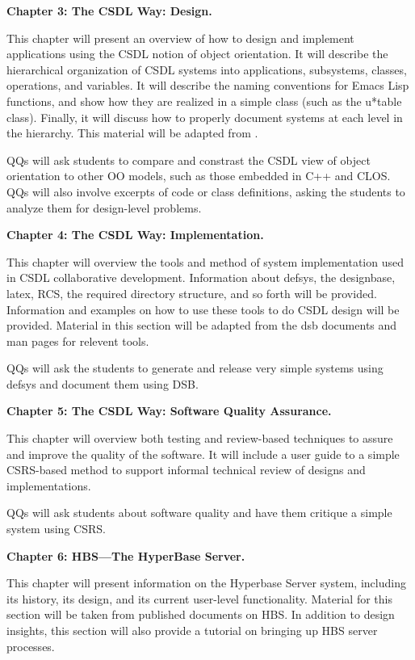 \begin{itemizenoindent}
\item {\bf Chapter 3: The CSDL Way: Design.} 

This chapter will present an overview of how to design and implement
applications using the CSDL notion of object orientation.  It will describe
the hierarchical organization of CSDL systems into applications,
subsystems, classes, operations, and variables.  It will describe the
naming conventions for Emacs Lisp functions, and show how they are realized
in a simple class (such as the u*table class).  Finally, it will discuss
how to properly document systems at each level in the hierarchy.  This
material will be adapted from \cite{csdl-93-02}.

QQs will ask students to compare and constrast the CSDL view of object
orientation to other OO models, such as those embedded in C++ and CLOS.
QQs will also involve excerpts of code or class definitions, asking the
students to analyze them for design-level problems. 

\item {\bf Chapter 4: The CSDL Way: Implementation.}  

This chapter will overview the tools and method of system implementation
used in CSDL collaborative development.  Information about defsys, the
designbase, latex, RCS, the required directory structure, and so forth will
be provided. Information and examples on how to use these tools to do CSDL
design will be provided.  Material in this section will be adapted from the
dsb documents and man pages for relevent tools.

QQs will ask the students to generate and release very simple systems using
defsys and document them using DSB.

\item {\bf Chapter 5: The CSDL Way: Software Quality Assurance.}

This chapter will overview both testing and review-based techniques to
assure and improve the quality of the software.  It will include a user
guide to a simple CSRS-based method to support informal technical review of
designs and implementations.

QQs will ask students about software quality and have them critique a
simple system using CSRS. 

\item {\bf Chapter 6: HBS---The HyperBase Server.}

This chapter will present information on the Hyperbase Server system,
including its history, its design, and its current user-level
functionality.  Material for this section will be taken from published
documents on HBS.  In addition to design insights, this section will also
provide a tutorial on bringing up HBS server processes. 


\end{itemizenoindent}
